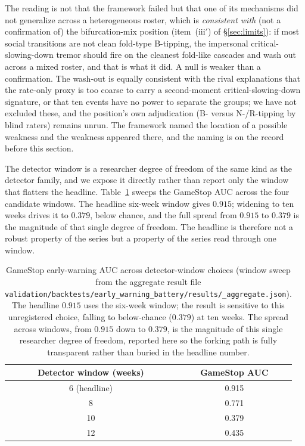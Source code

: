 \documentclass[11pt]{article}
\begin{document}
The reading is not that the framework failed but that one of its mechanisms did not generalize across a heterogeneous roster, which is \emph{consistent with} (not a confirmation of) the bifurcation-mix position (item~(iii$'$) of \S\ref{sec:limits}): if most social transitions are not clean fold-type B-tipping, the impersonal critical-slowing-down tremor should fire on the cleanest fold-like cascades and wash out across a mixed roster, and that is what it did. A null is weaker than a confirmation. The wash-out is equally consistent with the rival explanations that the rate-only proxy is too coarse to carry a second-moment critical-slowing-down signature, or that ten events have no power to separate the groups; we have not excluded these, and the position's own adjudication (B- versus N-/R-tipping by blind raters) remains unrun. The framework named the location of a possible weakness and the weakness appeared there, and the naming is on the record before this section.

The detector window is a researcher degree of freedom of the same kind as the detector family, and we expose it directly rather than report only the window that flatters the headline. Table~\ref{tab:window} sweeps the GameStop AUC across the four candidate windows. The headline six-week window gives $0.915$; widening to ten weeks drives it to $0.379$, below chance, and the full spread from $0.915$ to $0.379$ is the magnitude of that single degree of freedom. The headline is therefore not a robust property of the series but a property of the series read through one window.

\begin{table}[h]
\centering
\begin{tabular}{@{}cc@{}}
\toprule
\textbf{Detector window (weeks)} & \textbf{GameStop AUC} \\
\midrule
6 (headline) & 0.915 \\
8 & 0.771 \\
10 & 0.379 \\
12 & 0.435 \\
\bottomrule
\end{tabular}
\caption{GameStop early-warning AUC across detector-window choices (window sweep from the aggregate result file \texttt{validation/backtests/early\_warning\_battery/results/\_aggregate.json}). The headline $0.915$ uses the six-week window; the result is sensitive to this unregistered choice, falling to below-chance ($0.379$) at ten weeks. The spread across windows, from $0.915$ down to $0.379$, is the magnitude of this single researcher degree of freedom, reported here so the forking path is fully transparent rather than buried in the headline number.}
\label{tab:window}
\end{table}
\end{document}
